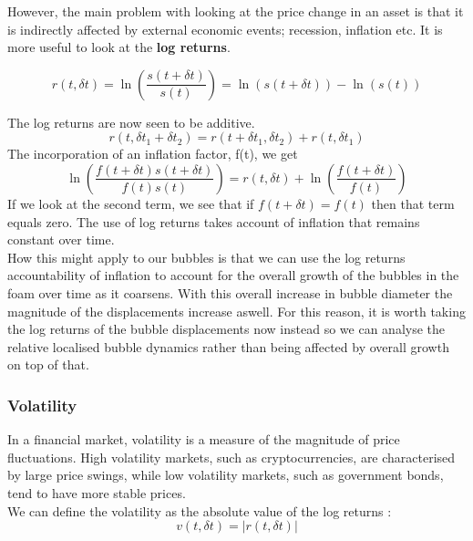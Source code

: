 However, the main problem with looking at the price change in an asset is that it is indirectly affected by external economic events; recession, inflation etc. It is more useful to look at the \textbf{log returns}.

\begin{equation}
    r(t, \delta t) = \ln\left(\frac{s(t+\delta t)}{s(t)}\right) = \ln(s(t+\delta t)) - \ln(s(t))
\end{equation}

The log returns are now seen to be additive.
\begin{equation}
    r(t, \delta t_1 + \delta t_2) = r(t+\delta t_1, \delta t_2) + r(t, \delta t_1)
\end{equation}
The incorporation of an inflation factor, f(t), we get
\begin{equation}
    \ln\left(\frac{f(t+\delta t)s(t+\delta t)}{f(t)s(t)}\right) = r(t, \delta t) + \ln\left(\frac{f(t+\delta t)}{f(t)}\right)
\end{equation}
If we look at the second term, we see that if $f(t+\delta t) = f(t)$ then that term equals zero. The use of log returns takes account of inflation that remains constant over time. \cite{richmond2013econophysics}\\

How this might apply to our bubbles is that we can use the log returns accountability of inflation to account for the overall growth of the bubbles in the foam over time as it coarsens. With this overall increase in bubble diameter the magnitude of the displacements increase aswell. For this reason, it is worth taking the log returns of the bubble displacements now instead so we can analyse the relative localised bubble dynamics rather than being affected by overall growth on top of that.

\subsubsection{Volatility}
In a financial market, volatility is a measure of the magnitude of price fluctuations. High volatility markets, such as cryptocurrencies, are characterised by large price swings, while low volatility markets, such as government bonds, tend to have more stable prices.\\

We can define the volatility as the absolute value of the log returns \cite{richmond2013econophysics}:
\begin{equation}
    v(t, \delta t) = |r(t, \delta t)|
\end{equation}

